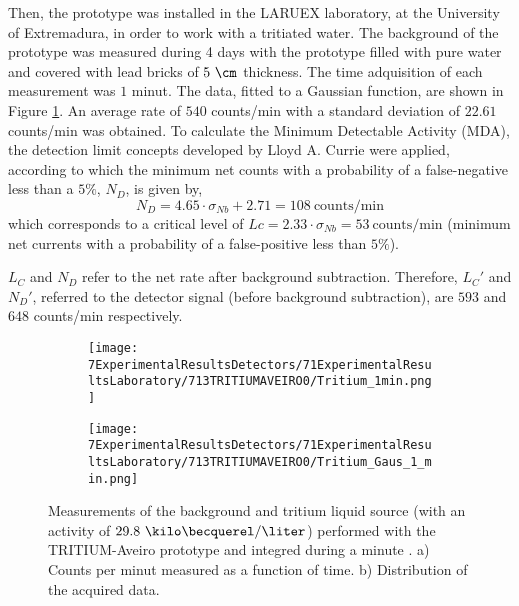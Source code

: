 
Then, the prototype was installed in the LARUEX laboratory, at the University of Extremadura, in order to work with a tritiated water. The background of the prototype was measured during 4 days with the prototype filled with pure water and covered with lead bricks of $5~\cm$ thickness. The time adquisition of each measurement was $1$ minut. The data, fitted to a Gaussian function, are shown in Figure \ref{subfig:MeasurementInRealTime}. An average rate of $540$ counts/min with a standard deviation of $22.61$ counts/min was obtained. To calculate the Minimum Detectable Activity (MDA), the detection limit concepts developed by Lloyd A. Currie \cite{CurieLimit} were applied, according to which the minimum net counts with a probability of a false-negative less than a $5\%$, $N_D$, is given by,
\begin{equation}
N_D = 4.65 \cdot{}\sigma_{Nb} + 2.71 = 108~\text{counts/min}
\label{eq:EquationNetCounts}
\end{equation}
which corresponds to a critical level of $Lc = 2.33\cdot{}\sigma_{Nb}=53 ~\text{counts/min}$ (minimum net currents with a probability of a false-positive less than $5\%$).

$L_C$ and $N_D$ refer to the net rate after background subtraction. Therefore, $L_C'$ and $N_D'$, referred to the detector signal (before background subtraction), are $593$ and $648$ counts/min respectively.

\begin{figure}
\centering
    \begin{subfigure}[b]{0.45\textwidth}
    \centering
    \texttt{[image: 7ExperimentalResultsDetectors/71ExperimentalResultsLaboratory/713TRITIUMAVEIRO0/Tritium\_1min.png]}  
    \caption{\label{subfig:MeasurementInRealTime}}
    \end{subfigure}
    \hfill
    \begin{subfigure}[b]{0.45\textwidth}
    \centering
    \texttt{[image: 7ExperimentalResultsDetectors/71ExperimentalResultsLaboratory/713TRITIUMAVEIRO0/Tritium\_Gaus\_1\_min.png]}  
    \caption{\label{subfig:DistributionofMeasurement}}
    \end{subfigure}
 \caption{Measurements of the background and tritium liquid source (with an activity of $29.8~\kilo\becquerel/\liter$) performed with the TRITIUM-Aveiro prototype and integred during a minute \cite{ExperimentalPaperCarlos}. a) Counts per minut measured as a function of time. b) Distribution of the acquired data.}
 \label{fig:BackgroundTritium1min}
\end{figure}

